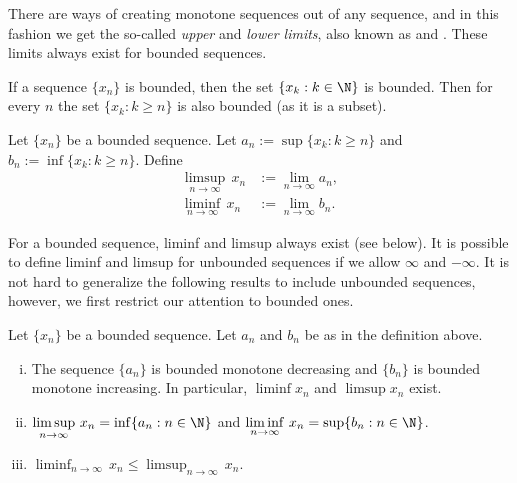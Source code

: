 \documentclass[12pt]{book}
\begin{document}
There are ways of creating monotone sequences out of any sequence, and
in this fashion we
get the so-called \emph{upper} and \emph{lower limits}, 
also known as \emph{} and
\emph{}.
These limits always exist for bounded
sequences.

If a sequence $\{ x_n \}$ is bounded, then 
the set $\{ x_k : k \in \N \}$ is bounded.
Then for every $n$
the set $\{ x_k : k \geq n \}$ is also bounded (as it is a subset).

\begin{defn} \label{liminflimsup:def}
Let $\{ x_n \}$ be a bounded sequence.
Let
$a_n := \sup \{ x_k : k \geq n \}$ and
$b_n := \inf \{ x_k : k \geq n \}$.  
Define
\begin{align*}
\limsup_{n \to \infty} \, x_n & := \lim_{n \to \infty} a_n ,
\\
\liminf_{n \to \infty} \, x_n & := \lim_{n \to \infty} b_n .
\end{align*}
\end{defn}

For a bounded sequence, liminf and limsup always exist (see below).  It is possible
to define liminf and limsup for unbounded sequences if we allow $\infty$
and $-\infty$.
It is not hard to generalize the following results to
include unbounded sequences, however, we first restrict our attention to
bounded ones.

\begin{prop}\label{prop:limsup}
Let $\{ x_n \}$ be a bounded sequence.
Let $a_n$ and $b_n$ be as in
the definition above.
\begin{enumerate}[(i)]
\item
The
sequence $\{ a_n \}$ is bounded monotone decreasing
and $\{ b_n \}$ is bounded monotone increasing.
In particular,
$\liminf x_n$ and $\limsup x_n$ exist.
\item
$\displaystyle \limsup_{n \to \infty} \, x_n = \inf \{ a_n : n \in \N \}$
and
$\displaystyle \liminf_{n \to \infty} \, x_n = \sup \{ b_n : n \in \N \}$.
\item
$\displaystyle \liminf_{n \to \infty} \, x_n \leq
\limsup_{n \to \infty} \, x_n$.
\end{enumerate}
\end{prop}
\end{document}

